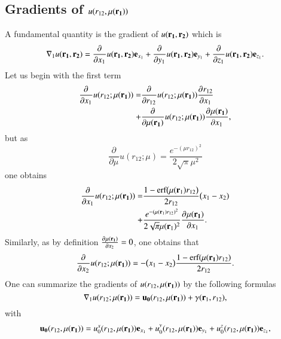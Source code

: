 \documentclass[aip,jcp,reprint,noshowkeys,superscriptaddress]{revtex4-1}
\newcommand{\deriv}[3]{\frac{\partial^{#3} #1}{\partial {#2}^{#3}}}
\newcommand{\bd}[1]{{\bf {#1}}}
\newcommand{\br}[0]{{\bf {r}}}
\newcommand{\bri}[1]{{\bf r}_{#1}}
\newcommand{\mur}[1]{\mu({\bf r_{#1}})}
\begin{document}
\subsection{Gradients of ${u}(r_{12},\mur{1})$}
A fundamental quantity is the gradient of ${u}(\bd{r_1},\bd{r_2})$ which is 
\begin{equation}
 \nabla_1 {u}(\bd{r_1},\bd{r_2}) = \deriv{}{x_1}{} {u}(\bd{r_1},\bd{r_2}) {\bf e}_{x_1} + \deriv{}{y_1}{} {u}(\bd{r_1},\bd{r_2}) {\bf e}_{y_1} + \deriv{}{z_1}{} {u}(\bd{r_1},\bd{r_2}) {\bf e}_{z_1}.
\end{equation}
Let us begin with the first term 
\begin{equation}
 \begin{aligned}
 \deriv{}{x_1}{} u(r_{12};\mur{1})=& \deriv{}{r_{12}}{} u(r_{12};\mur{1})\deriv{r_{12}}{x_1}{} \\ 
                                  +& \deriv{}{\mur{1}}{}u(r_{12};\mur{1}) \deriv{\mur{1}}{x_1}{},
 \end{aligned}
\end{equation}
but as 
\begin{equation}
 \deriv{}{\mu}{}u(r_{12};\mu) = \frac{e^{-(\mu r_{12})^2}}{2 \sqrt{\pi} \mu^2}
\end{equation}
one obtains 
\begin{equation}
 \begin{aligned}
  \label{eq:grad_mur_1}
 \deriv{}{x_1}{} u(r_{12};\mur{1}) =& \frac{1 - \text{erf}\big(\mu(\bri{1}) r_{12} \big)}{2 r_{12}}\big( x_1 - x_2) \\
                                   +&\frac{e^{-(\mu(\bri{1}) r_{12})^2}}{2 \sqrt{\pi} \mu(\bri{1})^2} \deriv{\mur{1}}{x_1}{}.  
 \end{aligned}
\end{equation}
Similarly, as by definition $\deriv{\mur{1}}{x_2}{} = 0$, one obtains that 
\begin{equation}
 \label{eq_grad_mur_r2}
 \deriv{}{x_2}{} u(r_{12};\mur{1}) = -\big(x_1 - x_2 \big)\frac{1 - \text{erf}(\mur{1} r_{12})}{2 r_{12}} .
\end{equation}
One can summarize the gradients of ${u}(r_{12},\mur{1})$ by the following formulas 
\begin{equation}
 \label{eq:nabla_1}
 \nabla_1 u(r_{12};\mur{1})  = {\bf u_0}(r_{12},\mur{1}) + {\bf \gamma}(\br_1, r_{12}), 
\end{equation}
with 
\begin{equation}
 \label{eq:dev_u0}
 {\bf u_0}(r_{12},\mur{1}) = u_0^x(r_{12},\mur{1}) {\bf e}_{x_1} + u_0^y(r_{12},\mur{1}) {\bf e}_{y_1} + u_0^z(r_{12},\mur{1}) {\bf e}_{z_1}, 
\end{equation}
\end{document}
